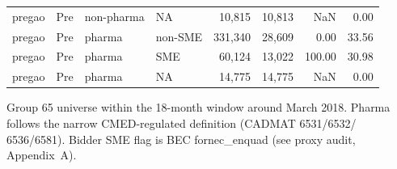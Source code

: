 \begin{table}[htbp]
\begin{threeparttable}
{\begin{tabular}{llllrrrr}
pregao & Pre & non-pharma & NA & 10,815 & 10,813 & NaN & 0.00 \\
pregao & Pre & pharma & non-SME & 331,340 & 28,609 & 0.00 & 33.56 \\
pregao & Pre & pharma & SME & 60,124 & 13,022 & 100.00 & 30.98 \\
pregao & Pre & pharma & NA & 14,775 & 14,775 & NaN & 0.00 \\
\bottomrule
\end{tabular}}
\begin{tablenotes}\footnotesize
\item Group 65 universe within the 18-month window around March 2018.
Pharma follows the narrow CMED-regulated definition (CADMAT 6531/6532/
6536/6581). Bidder SME flag is BEC fornec\_enquad (see proxy audit,
Appendix~A).
\end{tablenotes}
\end{threeparttable}
\end{table}
